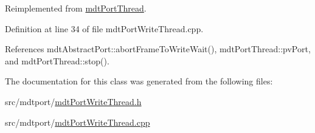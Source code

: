 Reimplemented from \hyperlink{classmdt_port_thread_a5746ea96689ed80179751ad1353f0b39}{mdt\-Port\-Thread}.



Definition at line 34 of file mdt\-Port\-Write\-Thread.\-cpp.



References mdt\-Abstract\-Port\-::abort\-Frame\-To\-Write\-Wait(), mdt\-Port\-Thread\-::pv\-Port, and mdt\-Port\-Thread\-::stop().



The documentation for this class was generated from the following files\-:\begin{DoxyCompactItemize}
\item 
src/mdtport/\hyperlink{mdt_port_write_thread_8h}{mdt\-Port\-Write\-Thread.\-h}\item 
src/mdtport/\hyperlink{mdt_port_write_thread_8cpp}{mdt\-Port\-Write\-Thread.\-cpp}\end{DoxyCompactItemize}
